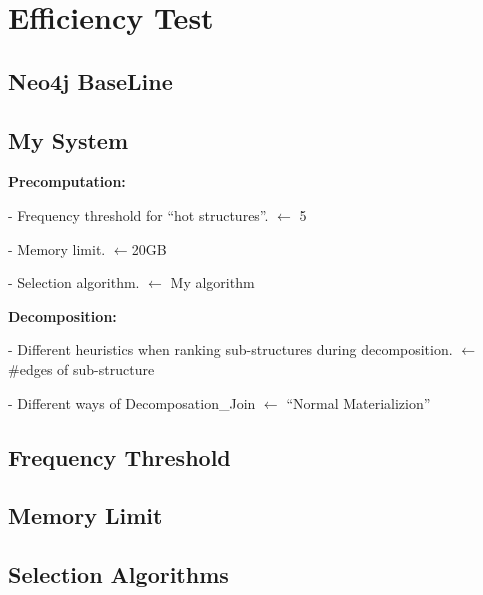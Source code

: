 \section{Efficiency Test}

\subsection{Neo4j BaseLine}

\subsection{My System}
\textbf{Precomputation:}

-  Frequency threshold for “hot structures”. $\leftarrow$ 5

-  Memory limit. $\leftarrow$20GB

-  Selection algorithm. $\leftarrow$ My algorithm

\textbf{Decomposition:}

-  Different heuristics when ranking sub-structures during decomposition. $\leftarrow$ #edges of sub-structure

-  Different ways of Decomposation\_Join $\leftarrow$ “Normal Materializion”

\subsection{Frequency Threshold}

\subsection{Memory Limit}

\subsection{Selection Algorithms}

